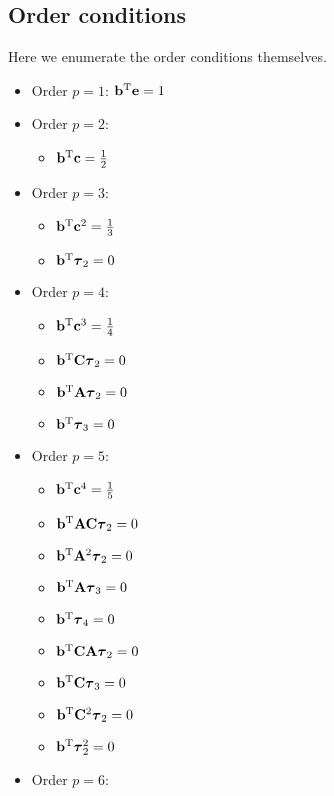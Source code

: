 \subsection{Order conditions}
Here we enumerate the order conditions themselves.

\begin{itemize}
  \item Order $p=1$: $\mathbf{b}^\mathrm{T} \mathbf{e} = 1$
  \item Order $p=2$: 
    \begin{itemize}
      \item $\mathbf{b}^\mathrm{T} \mathbf{c} = \frac{1}{2}$
    \end{itemize}
  \item Order $p=3$:
    \begin{itemize}
      \item $\mathbf{b}^\mathrm{T} \mathbf{c}^2 = \frac{1}{3}$
      \item $\mathbf{b}^\mathrm{T} \boldsymbol{\tau}_2 = 0$
    \end{itemize}
  \item Order $p=4$:
    \begin{itemize}
      \item $\mathbf{b}^\mathrm{T} \mathbf{c}^3 = \frac{1}{4}$
      \item $\mathbf{b}^\mathrm{T} \mathbf{C} \boldsymbol{\tau}_2 = 0$
      \item $\mathbf{b}^\mathrm{T} \mathbf{A} \boldsymbol{\tau}_2 = 0$
      \item $\mathbf{b}^\mathrm{T} \boldsymbol{\tau}_3 = 0$
    \end{itemize}
  \item Order $p=5$:
    \begin{itemize}
      \item $\mathbf{b}^\mathrm{T} \mathbf{c}^4 = \frac{1}{5}$
      \item $\mathbf{b}^\mathrm{T} \mathbf{A} \mathbf{C} \boldsymbol{\tau}_2 = 0$
      \item $\mathbf{b}^\mathrm{T} \mathbf{A}^2 \boldsymbol{\tau}_2 = 0$
      \item $\mathbf{b}^\mathrm{T} \mathbf{A} \boldsymbol{\tau}_3 = 0$
      \item $\mathbf{b}^\mathrm{T} \boldsymbol{\tau}_4 = 0$
      \item $\mathbf{b}^\mathrm{T} \mathbf{C} \mathbf{A} \boldsymbol{\tau}_2 = 0$
      \item $\mathbf{b}^\mathrm{T} \mathbf{C} \boldsymbol{\tau}_3 = 0$
      \item $\mathbf{b}^\mathrm{T} \mathbf{C}^2 \boldsymbol{\tau}_2 = 0$
      \item $\mathbf{b}^\mathrm{T} \boldsymbol{\tau}_2^2 = 0$
    \end{itemize}
  \item Order $p=6$:
    \begin{itemize}

\end{itemize}
\end{itemize}
